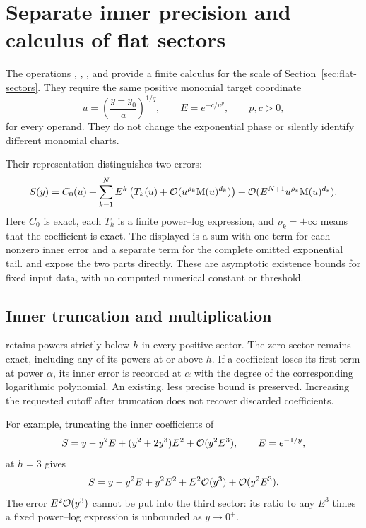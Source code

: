 \section{Separate inner precision and calculus of flat sectors}
\label{sec:flat-sector-operations}

The operations , ,
, and  provide
a finite calculus for the scale of Section~\ref{sec:flat-sectors}.
They require the same positive monomial target coordinate
\[
 u=\left(\frac{y-y_0}{a}\right)^{1/q},\qquad
 E=e^{-c/u^p},\qquad p,c>0,
\]
for every operand. They do not change the exponential phase or silently
identify different monomial charts.

Their representation distinguishes two errors:
\begin{equation}
 S(y)=C_0(u)+\sum_{k=1}^{N}E^k
 \left(T_k(u)+\mathcal O(u^{\rho_k}\mathrm M(u)^{d_k})\right)
 +\mathcal O(E^{N+1}u^{\rho_*}\mathrm M(u)^{d_*}).
 \label{eq:flat-two-precision}
\end{equation}
Here $C_0$ is exact, each $T_k$ is a finite power--log expression, and
$\rho_k=+\infty$ means that the coefficient is exact. The displayed
 is a sum with one term for each nonzero inner error and a
separate term for the complete omitted exponential tail.
 and  expose the two parts directly.
These are asymptotic existence bounds for fixed input data, with no computed
numerical constant or threshold.

\subsection{Inner truncation and multiplication}

 retains powers strictly below $h$ in every
positive sector. The zero sector remains exact, including any of its powers
at or above $h$. If a coefficient loses its first term at power $\alpha$,
its inner error is recorded at $\alpha$ with the degree of the corresponding
logarithmic polynomial. An existing, less precise bound is preserved.
Increasing the requested cutoff after truncation does not recover discarded
coefficients.

For example, truncating the inner coefficients of
\[
 S=y-y^2E+(y^2+2y^3)E^2+\mathcal O(y^2E^3),\qquad E=e^{-1/y},
\]
at $h=3$ gives
\[
 S=y-y^2E+y^2E^2+E^2\mathcal O(y^3)+\mathcal O(y^2E^3).
\]
The error $E^2\mathcal O(y^3)$ cannot be put into the third sector: its ratio to
any $E^3$ times a fixed power--log expression is unbounded as $y\to0^+$.

